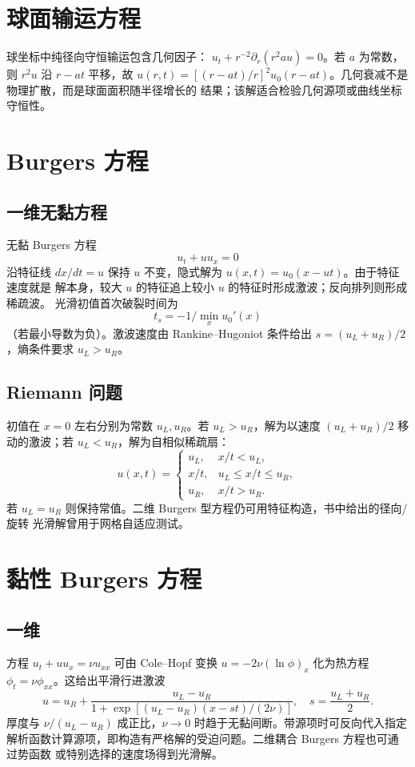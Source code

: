 \documentclass[11pt,a4paper,openany,fontset=none]{ctexbook}
\begin{document}
\section{球面输运方程}
球坐标中纯径向守恒输运包含几何因子：
$u_t+r^{-2}\partial_r(r^2 a u)=0$。若 $a$ 为常数，则 $r^2u$ 沿 $r-at$ 平移，故
$u(r,t)=[(r-at)/r]^2u_0(r-at)$。几何衰减不是物理扩散，而是球面面积随半径增长的
结果；该解适合检验几何源项或曲线坐标守恒性。

\section{Burgers 方程}
\subsection{一维无黏方程}
无黏 Burgers 方程
\begin{equation}u_t+u u_x=0\end{equation}
沿特征线 $dx/dt=u$ 保持 $u$ 不变，隐式解为 $u(x,t)=u_0(x-u t)$。由于特征速度就是
解本身，较大 $u$ 的特征追上较小 $u$ 的特征时形成激波；反向排列则形成稀疏波。
光滑初值首次破裂时间为
\begin{equation}t_s=-1/\min_x u_0'(x)\end{equation}
（若最小导数为负）。激波速度由 Rankine--Hugoniot 条件给出
$s=(u_L+u_R)/2$，熵条件要求 $u_L>u_R$。

\subsection{Riemann 问题}
初值在 $x=0$ 左右分别为常数 $u_L,u_R$。若 $u_L>u_R$，解为以速度
$(u_L+u_R)/2$ 移动的激波；若 $u_L<u_R$，解为自相似稀疏扇：
\begin{equation}
 u(x,t)=\begin{cases}
 u_L,&x/t<u_L,\\ x/t,&u_L\le x/t\le u_R,\\u_R,&x/t>u_R.
 \end{cases}
\end{equation}
若 $u_L=u_R$ 则保持常值。二维 Burgers 型方程仍可用特征构造，书中给出的径向/旋转
光滑解曾用于网格自适应测试。

\section{黏性 Burgers 方程}
\subsection{一维}
方程 $u_t+uu_x=\nu u_{xx}$ 可由 Cole--Hopf 变换
$u=-2\nu(\ln\phi)_x$ 化为热方程 $\phi_t=\nu\phi_{xx}$。这给出平滑行进激波
\begin{equation}
 u=u_R+\frac{u_L-u_R}{1+\exp[(u_L-u_R)(x-st)/(2\nu)]},
 \quad s=\frac{u_L+u_R}{2}.
\end{equation}
厚度与 $\nu/(u_L-u_R)$ 成正比，$\nu\to0$ 时趋于无黏间断。带源项时可反向代入指定
解析函数计算源项，即构造有严格解的受迫问题。二维耦合 Burgers 方程也可通过势函数
或特别选择的速度场得到光滑解。
\end{document}
